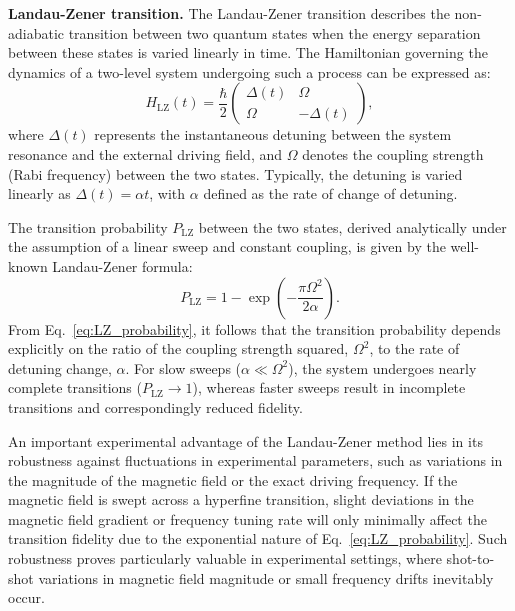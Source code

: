 \textbf{Landau-Zener transition.}
The Landau-Zener transition \cite{landau_zur_1932,zener_non-adiabatic_1997} describes the non-adiabatic transition between two quantum states when the energy separation between these states is varied linearly in time. The Hamiltonian governing the dynamics of a two-level system undergoing such a process can be expressed as:
\begin{equation}
H_{\text{LZ}}(t) = \frac{\hbar}{2}
\begin{pmatrix}
\Delta(t) & \Omega \\
\Omega & -\Delta(t)
\end{pmatrix},
\label{eq:LZ_Hamiltonian}
\end{equation}
where $\Delta(t)$ represents the instantaneous detuning between the system resonance and the external driving field, and $\Omega$ denotes the coupling strength (Rabi frequency) between the two states. Typically, the detuning is varied linearly as $\Delta(t) = \alpha t$, with $\alpha$ defined as the rate of change of detuning.

The transition probability $P_{\text{LZ}}$ between the two states, derived analytically under the assumption of a linear sweep and constant coupling, is given by the well-known Landau-Zener formula:
\begin{equation}
P_{\text{LZ}} = 1 - \exp\left(-\frac{\pi \Omega^2}{2\alpha}\right).
\label{eq:LZ_probability}
\end{equation}
From Eq.~\eqref{eq:LZ_probability}, it follows that the transition probability depends explicitly on the ratio of the coupling strength squared, $\Omega^2$, to the rate of detuning change, $\alpha$. For slow sweeps ($\alpha \ll \Omega^2$), the system undergoes nearly complete transitions ($P_{\text{LZ}}\rightarrow1$), whereas faster sweeps result in incomplete transitions and correspondingly reduced fidelity.

An important experimental advantage of the Landau-Zener method lies in its robustness against fluctuations in experimental parameters, such as variations in the magnitude of the magnetic field or the exact driving frequency. If the magnetic field is swept across a hyperfine transition, slight deviations in the magnetic field gradient or frequency tuning rate will only minimally affect the transition fidelity due to the exponential nature of Eq.~\eqref{eq:LZ_probability}. Such robustness proves particularly valuable in experimental settings, where shot-to-shot variations in magnetic field magnitude or small frequency drifts inevitably occur.

